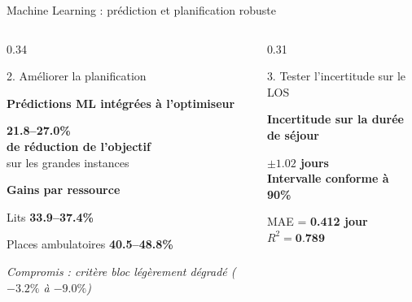 \documentclass[aspectratio=169,11pt]{beamer}
\begin{document}
\begin{frame}{Machine Learning : prédiction et planification robuste}
\begin{columns}[T,onlytextwidth]
\begin{column}{0.34\textwidth}
			\begin{block}{2. Améliorer la planification}
				\scriptsize
				
				\textbf{Prédictions ML intégrées à l'optimiseur}
				
				\vspace{0.18cm}
				
				{\Large\color{mcmPrimary}\textbf{21.8--27.0\%}}\\
				\textbf{de réduction de l'objectif}\\
				sur les grandes instances
				
				\vspace{0.25cm}
				
				\textbf{Gains par ressource}
				
				\vspace{0.12cm}
				
				Lits
				\hfill
				{\color{mcmPrimary}\textbf{33.9--37.4\%}}
				
				\vspace{0.10cm}
				
				Places ambulatoires
				\hfill
				{\color{mcmPrimary}\textbf{40.5--48.8\%}}
				
				\vspace{0.30cm}
				
				\textit{Compromis : critère bloc légèrement dégradé
					($-3.2\%$ à $-9.0\%$)}
				
			\end{block}
			
		\end{column}
		
		
		\begin{column}{0.31\textwidth}
			
			\begin{block}{3. Tester l'incertitude sur le LOS}
				\scriptsize
				
				\textbf{Incertitude sur la durée de séjour}
				
				\vspace{0.18cm}
				
				{\Large\color{mcmPrimary}\textbf{$\pm 1.02$ jours}}\\
				\textbf{Intervalle conforme à 90\%}
				
				\vspace{0.12cm}
				
				MAE = \textbf{0.412 jour}
				\qquad
				$R^2 = \textbf{0.789}$
				

\end{block}
\end{column}
\end{columns}
\end{frame}
\end{document}
